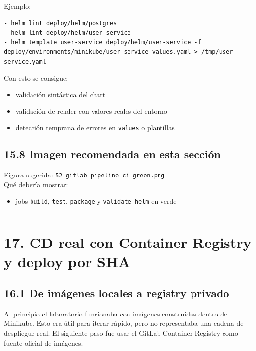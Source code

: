 \documentclass[
a4paper,
12pt]{report}
\providecommand{\tightlist}{%
  \setlength{\itemsep}{0pt}\setlength{\parskip}{0pt}}
\begin{document}
Ejemplo:

\begin{verbatim}
- helm lint deploy/helm/postgres
- helm lint deploy/helm/user-service
- helm template user-service deploy/helm/user-service -f deploy/environments/minikube/user-service-values.yaml > /tmp/user-service.yaml
\end{verbatim}

Con esto se consigue:

\begin{itemize}
\tightlist
\item
  validación sintáctica del chart
\item
  validación de render con valores reales del entorno
\item
  detección temprana de errores en \texttt{values} o plantillas
\end{itemize}

\section{15.8 Imagen recomendada en esta
sección}\label{imagen-recomendada-en-esta-secciuxf3n-9}

Figura sugerida: \texttt{52-gitlab-pipeline-ci-green.png}\\
Qué debería mostrar:

\begin{itemize}
\tightlist
\item
  jobs \texttt{build}, \texttt{test}, \texttt{package} y
  \texttt{validate\_helm} en verde
\end{itemize}

\begin{center}\rule{0.5\linewidth}{0.5pt}\end{center}

\chapter{17. CD real con Container Registry y deploy por
SHA}\label{cd-real-con-container-registry-y-deploy-por-sha}

\section{16.1 De imágenes locales a registry
privado}\label{de-imuxe1genes-locales-a-registry-privado}

Al principio el laboratorio funcionaba con imágenes construidas dentro
de Minikube. Esto era útil para iterar rápido, pero no representaba una
cadena de despliegue real. El siguiente paso fue usar el GitLab
Container Registry como fuente oficial de imágenes.
\end{document}
